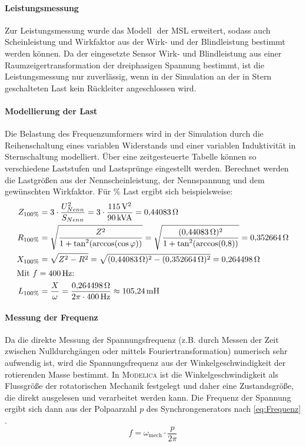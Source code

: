\paragraph{Leistungsmessung}\label{leistungsmessung}
Zur Leistungsmessung wurde das Modell ­ der MSL erweitert, sodass auch Scheinleistung und Wirkfaktor aus der Wirk- und der Blindleistung bestimmt werden können. Da der eingesetzte Sensor Wirk- und Blindleistung aus einer Raumzeigertransformation der dreiphasigen Spannung bestimmt, ist die Leistungsmessung nur zuverlässig, wenn in der Simulation an der in Stern geschalteten Last kein Rückleiter angeschlossen wird.

\paragraph{Modellierung der Last}\label{parametrierung-der-last}
Die Belastung des Frequenzumformers wird in der Simulation durch die Reihenschaltung eines variablen Widerstands und einer variablen Induktivität in Sternschaltung modelliert. Über eine zeitgesteuerte Tabelle können so verschiedene Laststufen und Lastsprünge eingestellt werden. Berechnet werden die Lastgrößen aus der Nennscheinleistung, der Nennspannung und dem gewünschten Wirkfaktor. Für \unit[100]{\%} Last ergibt sich beispielsweise:
\begin{align}
Z_{100\%} &= 3\cdot\frac{U_{Nenn}^2}{S_{Nenn}}= 3\cdot \frac{\unit[115]{V^2}}{\unit[90]{kVA}} = \unit[0{,}44083]{\Omega} \\
R_{100\%} &= \sqrt{\frac{Z^2}{1+\tan^2(\arccos(\cos\varphi))}}=\sqrt{\frac{(\unit[0{,}44083]{\Omega})^2}{1+\tan^2(\arccos(0{,}8))}}=\unit[0{,}352664]{\Omega} \\
X_{100\%} &= \sqrt{Z^2-R^2}=\sqrt{(\unit[0{,}44083]{\Omega})^2 - (\unit[0{,}352664]{\Omega})^2}=\unit[0{,}264498]{\Omega} \\
\intertext{Mit $f=\unit[400]{Hz}$:}
L_{100\%} &= \frac X\omega = \frac{\unit[0{,}264498]{\Omega}}{2\pi\cdot\unit[400]{Hz}}\approx \unit[105{,}24]{mH}\\
\end{align}

\paragraph{Messung der Frequenz}
Da die direkte Messung der Spannungsfrequenz (z.B. durch Messen der Zeit zwischen Nulldurchgängen oder mittels Fouriertransformation) numerisch sehr aufwendig ist, wird die Spannungsfrequenz aus der Winkelgeschwindigkeit der rotierenden Masse bestimmt. In \textsc{Modelica} ist die Winkelgeschwindigkeit  als Flussgröße der rotatorischen Mechanik festgelegt und daher eine Zustandsgröße, die direkt ausgelesen und verarbeitet werden kann. Die Frequenz der Spannung ergibt sich dann aus der Polpaarzahl $p$ des Synchrongenerators nach \cref{eq:Frequenz} .
\begin{equation}
	f = \omega_\mathrm{mech}\cdot\frac{p}{2\pi}\label{eq:Frequenz}
\end{equation}

